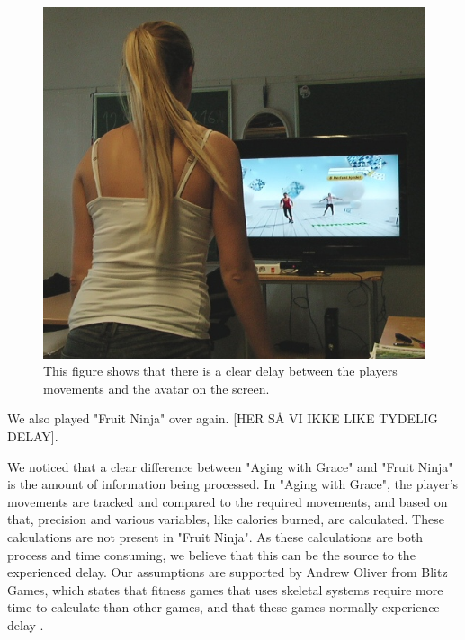 \begin{figure} [H]
\centering
\includegraphics[scale=0.6]{kineDelay.jpg}
\caption[Kinect sensor delay]{This figure shows that there is a clear delay between the players movements and the avatar on the screen.}
\label{fig:remakeDelay}
\end{figure} 

We also played "Fruit Ninja" over again. [HER SÅ VI IKKE LIKE TYDELIG DELAY].

We noticed that a clear difference between "Aging with Grace" and "Fruit Ninja" is the amount of information being processed. In "Aging with Grace", the player's movements are tracked and compared to the required movements, and based on that, precision and various variables, like calories burned, are calculated. These calculations are not present in "Fruit Ninja". As these calculations are both process and time consuming, we believe that this can be the source to the experienced delay. Our assumptions are supported by Andrew Oliver from Blitz Games, which states that fitness games that uses skeletal systems require more time to calculate than other games, and that these games normally experience delay \cite{kinectLag}. 

